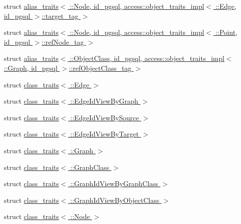 \begin{DoxyCompactItemize}
\item 
struct \hyperlink{structodb_1_1alias__traits_3_01_1_1_node_00_01id__pgsql_00_01access_1_1object__traits__impl_3_01c77bcdc9abf6acd8227118fe90727154}{alias\+\_\+traits$<$ \+::\+Node, id\+\_\+pgsql, access\+::object\+\_\+traits\+\_\+impl$<$ \+::\+Edge, id\+\_\+pgsql $>$\+::target\+\_\+tag $>$}
\item 
struct \hyperlink{structodb_1_1alias__traits_3_01_1_1_node_00_01id__pgsql_00_01access_1_1object__traits__impl_3_013274b82f95462fed7f5ef459567458b6}{alias\+\_\+traits$<$ \+::\+Node, id\+\_\+pgsql, access\+::object\+\_\+traits\+\_\+impl$<$ \+::\+Point, id\+\_\+pgsql $>$\+::ref\+Node\+\_\+tag $>$}
\item 
struct \hyperlink{structodb_1_1alias__traits_3_01_1_1_object_class_00_01id__pgsql_00_01access_1_1object__traits__i1ebaecaa53ca957735d3ecda1964730f}{alias\+\_\+traits$<$ \+::\+Object\+Class, id\+\_\+pgsql, access\+::object\+\_\+traits\+\_\+impl$<$ \+::\+Graph, id\+\_\+pgsql $>$\+::ref\+Object\+Class\+\_\+tag $>$}
\item 
struct \hyperlink{structodb_1_1class__traits_3_01_1_1_edge_01_4}{class\+\_\+traits$<$ \+::\+Edge $>$}
\item 
struct \hyperlink{structodb_1_1class__traits_3_01_1_1_edge_id_view_by_graph_01_4}{class\+\_\+traits$<$ \+::\+Edge\+Id\+View\+By\+Graph $>$}
\item 
struct \hyperlink{structodb_1_1class__traits_3_01_1_1_edge_id_view_by_source_01_4}{class\+\_\+traits$<$ \+::\+Edge\+Id\+View\+By\+Source $>$}
\item 
struct \hyperlink{structodb_1_1class__traits_3_01_1_1_edge_id_view_by_target_01_4}{class\+\_\+traits$<$ \+::\+Edge\+Id\+View\+By\+Target $>$}
\item 
struct \hyperlink{structodb_1_1class__traits_3_01_1_1_graph_01_4}{class\+\_\+traits$<$ \+::\+Graph $>$}
\item 
struct \hyperlink{structodb_1_1class__traits_3_01_1_1_graph_class_01_4}{class\+\_\+traits$<$ \+::\+Graph\+Class $>$}
\item 
struct \hyperlink{structodb_1_1class__traits_3_01_1_1_graph_id_view_by_graph_class_01_4}{class\+\_\+traits$<$ \+::\+Graph\+Id\+View\+By\+Graph\+Class $>$}
\item 
struct \hyperlink{structodb_1_1class__traits_3_01_1_1_graph_id_view_by_object_class_01_4}{class\+\_\+traits$<$ \+::\+Graph\+Id\+View\+By\+Object\+Class $>$}
\item 
struct \hyperlink{structodb_1_1class__traits_3_01_1_1_node_01_4}{class\+\_\+traits$<$ \+::\+Node $>$}

\end{DoxyCompactItemize}
